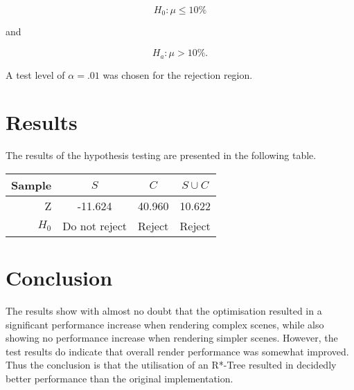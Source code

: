 \documentclass[a4paper]{article}
\begin{document}
$$ H_0: \mu \leq 10\% $$
\begin{center}
  and
\end{center}
$$ H_a: \mu > 10\%. $$

A test level of $\alpha = .01$ was chosen for the rejection region.

\section{Results}

The results of the hypothesis testing are presented in the following table.

\begin{center}
  \begin{tabular}{ | r || c | c | c | }
    \hline
    Sample  & $S$           & $C$    & $S \cup C$ \\ \hline \hline
    Z       & -11.624       & 40.960 & 10.622     \\ \hline
    $H_0$   & Do not reject & Reject & Reject     \\
    \hline
  \end{tabular}
\end{center}

\section{Conclusion}

The results show with almost no doubt that the optimisation resulted in a significant performance increase when rendering complex scenes, while also showing no performance increase when rendering simpler scenes. However, the test results do indicate that overall render performance was somewhat improved. Thus the conclusion is that the utilisation of an R*-Tree resulted in decidedly better performance than the original implementation.
\end{document}
